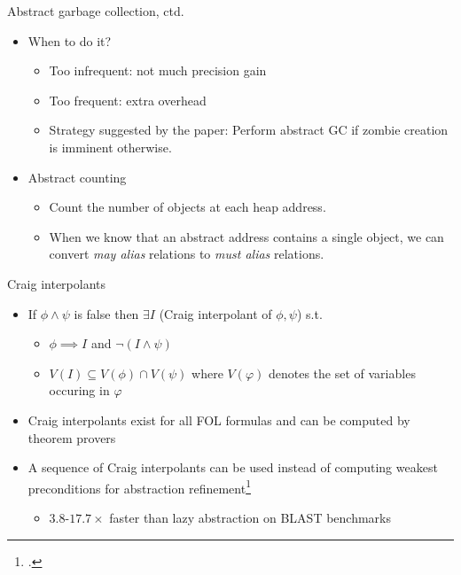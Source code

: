 \documentclass[aspectratio=169,notes]{beamer}
\begin{document}
\begin{frame}{Abstract garbage collection, ctd.}
  \begin{itemize}[<+->]
  \item When to do it?
    \begin{itemize}
    \item Too infrequent: not much precision gain
    \item Too frequent: extra overhead\pause
    \item Strategy suggested by the paper: Perform abstract GC if zombie creation is imminent otherwise.
    \end{itemize}
  \item Abstract counting
    \begin{itemize}
    \item Count the number of objects at each heap address.
    \item When we know that an abstract address contains a single object, we can convert \emph{may alias} relations to \emph{must alias} relations.
    \end{itemize}
  \end{itemize}
\end{frame}

\begin{frame}{Craig interpolants}
  \begin{itemize}[<+->]
  \item If $\phi \wedge \psi$ is false then $\exists I$ (Craig interpolant of $\phi, \psi$) s.t.
    \begin{itemize}[<+->]
    \item $\phi \implies I$ and $\neg (I \wedge \psi)$
    \item $V(I) \subseteq V(\phi) \cap V(\psi)$ where $V(\varphi)$ denotes the set of variables occuring in $\varphi$
    \end{itemize}
  \item Craig interpolants exist for all FOL formulas and can be computed by theorem provers
  \item A sequence of Craig interpolants can be used instead of computing weakest preconditions for abstraction refinement\footcite{mcmillan2006lazy}\pause
    \begin{itemize}
    \item $3.8$-$17.7\times$ faster than lazy abstraction on BLAST benchmarks
    \end{itemize}
  \end{itemize}
\end{frame}
\end{document}
